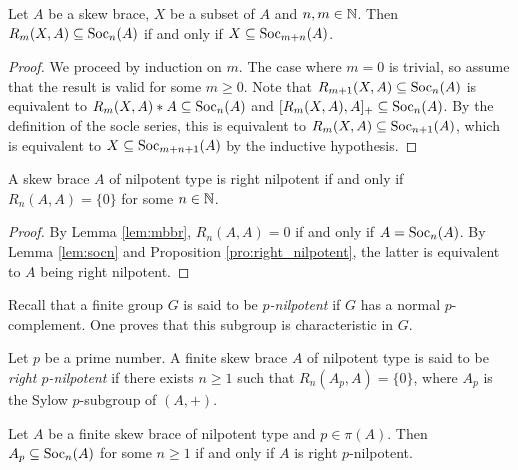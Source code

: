 \begin{lemma}
\label{lem:mbbr}
	Let $A$ be a skew brace, $X$ be a subset of $A$ and $n,m\in\mathbb{N}$.
	Then $R_m(X,A)\subseteq \operatorname{Soc}_n(A)$ 
	if and only if $X\subseteq\operatorname{Soc}_{m+n}(A)$.
\end{lemma}

\begin{proof}
    We proceed by induction on $m$. The case where $m=0$ is trivial, so assume that the result is valid for some $m\geq0$. 
	Note that $R_{m+1}(X,A)\subseteq\operatorname{Soc}_{n}(A)$ is equivalent to  $R_m(X,A)*A\subseteq\operatorname{Soc}_{n}(A)$ and $[R_m(X,A),A]_+ \subseteq\operatorname{Soc}_{n}(A)$. 
	By the definition of the socle series, this is equivalent to $R_m(X,A)\subseteq\operatorname{Soc}_{n+1}(A)$, 
	which is equivalent to $X\subseteq\operatorname{Soc}_{m+n+1}(A)$ by the inductive hypothesis.
\end{proof}

\begin{lemma}
	A skew brace $A$ of nilpotent type is right nilpotent if and only if $R_n(A,A)=\{0\}$ for some $n\in\mathbb{N}$.
%	
\end{lemma}

\begin{proof}
    By Lemma \ref{lem:mbbr}, $R_n(A,A)=0$ if and only if $A=\operatorname{Soc}_{n}(A)$. By Lemma \ref{lem:socn} and Proposition \ref{pro:right_nilpotent}, 
    the latter is equivalent to $A$ being right nilpotent.
\end{proof}

Recall that a finite group $G$ is said to be \emph{$p$-nilpotent} if $G$ has a normal $p$-complement. One proves that this subgroup is characteristic in $G$. 

\begin{definition}
    Let $p$ be a prime number. A finite skew brace $A$ of nilpotent type 
    is said to be \emph{right $p$-nilpotent} if there 
    exists $n\geq1$ such that $R_n(A_p,A)=\{0\}$, where $A_p$ is the Sylow $p$-subgroup of $(A,+)$.
\end{definition}

\begin{proposition}
\label{pro:soc_n}
    Let $A$ be a finite skew brace of nilpotent type and $p\in\pi(A)$. Then
    $A_p\subseteq\operatorname{Soc}_n(A)$ for some $n\geq1$ if and only if 
    $A$ is right $p$-nilpotent. 
\end{proposition}

